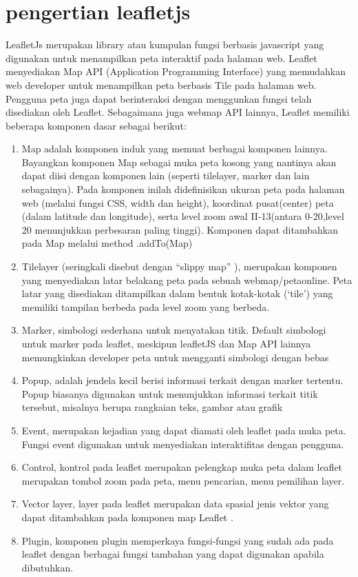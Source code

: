 \section{pengertian leafletjs}
LeafletJs merupakan  library  atau  kumpulan  fungsi  berbasis  javascript yang  digunakan  untuk  menampilkan  peta  interaktif  pada  halaman  web. Leaflet menyediakan  Map API (Application  Programming  Interface)  yang  memudahkan web   developer untuk menampilkan peta berbasis Tile pada halaman web. Pengguna peta juga dapat berinteraksi dengan menggunkan fungsi telah disediakan oleh Leaflet. Sebagaimana juga webmap API lainnya, Leaflet memiliki beberapa komponen dasar sebagai berikut:
\begin{enumerate}
\item Map  adalah  komponen  induk  yang  memuat  berbagai komponen  lainnya. Bayangkan komponen Map sebagai muka peta kosong yang nantinya akan dapat  diisi  dengan  komponen  lain  (seperti  tilelayer, marker  dan  lain sebagainya). Pada komponen inilah didefinisikan ukuran peta pada halaman web (melalui fungsi CSS, width dan height), koordinat pusat(center) peta (dalam latitude dan longitude), serta  level  zoom  awal II-13(antara 0-20,level  20  menunjukkan  perbesaran  paling  tinggi). Komponen dapat ditambahkan pada Map melalui method .addTo(Map)
\item Tilelayer   (seringkali   disebut  dengan  “slippy  map” ), merupakan komponen    yang    menyediakan    latar    belakang    peta    pada    sebuah webmap/petaonline. Peta latar yang disediakan ditampilkan dalam bentuk kotak-kotak (‘tile’) yang memiliki tampilan berbeda pada level zoom yang berbeda.
\item Marker,  simbologi  sederhana  untuk  menyatakan  titik. Default  simbologi untuk  marker  pada  leaflet,  meskipun  leafletJS  dan  Map  API  lainnya memungkinkan developer peta untuk mengganti simbologi dengan bebas
\item Popup, adalah jendela kecil berisi informasi terkait dengan marker tertentu. Popup  biasanya  digunakan  untuk  menunjukkan  informasi  terkait  titik tersebut, misalnya berupa rangkaian teks, gambar atau grafik
\item Event, merupakan kejadian yang dapat diamati oleh leaflet pada muka peta. Fungsi event digunakan untuk menyediakan interaktifitas dengan pengguna.
\item Control,  kontrol  pada  leaflet  merupakan  pelengkap  muka  peta  dalam leaflet   merupakan   tombol   zoom   pada   peta, menu   pencarian, menu pemilihan layer.
\item Vector  layer,  layer  pada  leaflet  merupakan  data  spasial  jenis  vektor  yang dapat ditambahkan pada komponen map Leaflet .
\item Plugin, komponen plugin memperkaya fungsi-fungsi yang sudah ada pada leaflet dengan berbagai fungsi tambahan yang dapat digunakan apabila dibutuhkan.
\end{enumerate}
